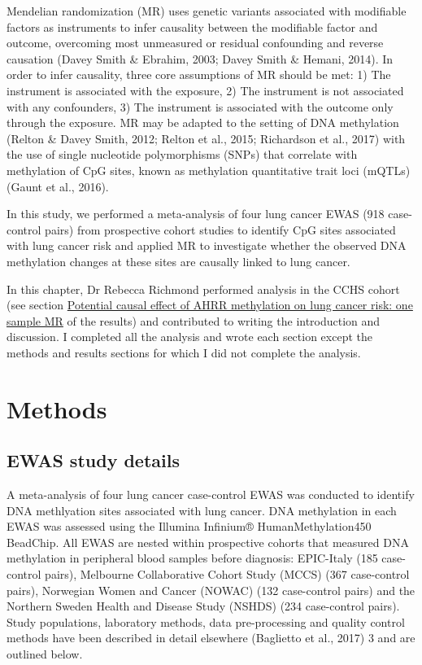 \documentclass[11pt,twoside]{bristolthesis}
\begin{document}
Mendelian randomization (MR) uses genetic variants associated with modifiable factors as instruments to infer causality between the modifiable factor and outcome, overcoming most unmeasured or residual confounding and reverse causation (Davey Smith \& Ebrahim, 2003; Davey Smith \& Hemani, 2014). In order to infer causality, three core assumptions of MR should be met: 1) The instrument is associated with the exposure, 2) The instrument is not associated with any confounders, 3) The instrument is associated with the outcome only through the exposure. MR may be adapted to the setting of DNA methylation (Relton \& Davey Smith, 2012; Relton et al., 2015; Richardson et al., 2017) with the use of single nucleotide polymorphisms (SNPs) that correlate with methylation of CpG sites, known as methylation quantitative trait loci (mQTLs) (Gaunt et al., 2016).

In this study, we performed a meta-analysis of four lung cancer EWAS (918 case-control pairs) from prospective cohort studies to identify CpG sites associated with lung cancer risk and applied MR to investigate whether the observed DNA methylation changes at these sites are causally linked to lung cancer.

In this chapter, Dr Rebecca Richmond performed analysis in the CCHS cohort (see section \protect\hyperlink{potential-causal-effect-of-ahrr-methylation-on-lung-cancer-risk-one-sample-mr}{Potential causal effect of AHRR methylation on lung cancer risk: one sample MR} of the results) and contributed to writing the introduction and discussion. I completed all the analysis and wrote each section except the methods and results sections for which I did not complete the analysis.

\hypertarget{methods-3}{%
\section{Methods}\label{methods-3}}

\hypertarget{ewas-study-details}{%
\subsection{EWAS study details}\label{ewas-study-details}}

A meta-analysis of four lung cancer case-control EWAS was conducted to identify DNA methlyation sites associated with lung cancer. DNA methylation in each EWAS was assessed using the Illumina Infinium® HumanMethylation450 BeadChip. All EWAS are nested within prospective cohorts that measured DNA methylation in peripheral blood samples before diagnosis: EPIC-Italy (185 case-control pairs), Melbourne Collaborative Cohort Study (MCCS) (367 case-control pairs), Norwegian Women and Cancer (NOWAC) (132 case-control pairs) and the Northern Sweden Health and Disease Study (NSHDS) (234 case-control pairs). Study populations, laboratory methods, data pre-processing and quality control methods have been described in detail elsewhere (Baglietto et al., 2017) 3 and are outlined below.
\end{document}
